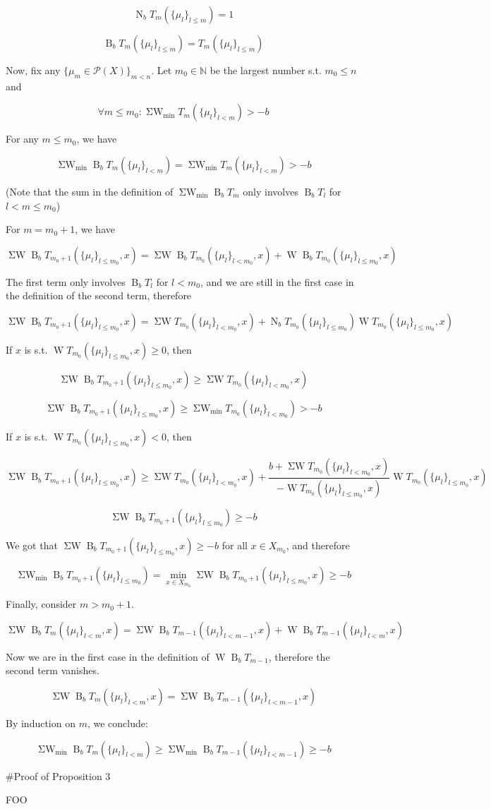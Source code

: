 \documentclass[a4paper]{article}
\newcommand{\Nats}{\mathbb{N}}
\newcommand{\Prob}{\mathcal{P}}
\newcommand{\B}{\operatorname{B}_b}
\newcommand{\N}{\operatorname{N}_b}
\newcommand{\W}{\operatorname{W}}
\newcommand{\SW}{\operatorname{\Sigma W}}
\newcommand{\SWm}{\operatorname{\Sigma W}_{\min}}
\begin{document}
$$\N T_m(\{\mu_l\}_{l \leq m}) = 1$$

$$\B T_m(\{\mu_l\}_{l \leq m}) = T_m(\{\mu_l\}_{l \leq m})$$

Now, fix any ${\{\mu_m \in \Prob(X)\}_{m<n}}$. Let ${m_0 \in \Nats}$ be the largest number s.t. ${m_0 \leq n}$ and 

$$\forall m \leq m_0: \SWm T_m(\{\mu_l\}_{l<m}) > -b$$

For any ${m \leq m_0}$, we have

$$\SWm \B T_m(\{\mu_l \}_{l<m})=\SWm T_m(\{\mu_l \}_{l<m}) > -b$$

(Note that the sum in the definition of ${\SWm \B T_m}$ only involves ${\B T_l}$ for ${l < m \leq m_0}$)

For ${m=m_0+1}$, we have

$$\SW \B T_{m_0+1}(\{\mu_l \}_{l \leq m_0},x) = \SW \B T_{m_0}(\{\mu_l \}_{l < m_0},x) + \W \B T_{m_0}(\{\mu_l \}_{l \leq m_0},x)$$

The first term only involves ${\B T_l}$ for ${l < m_0}$, and we are still in the first case in the definition of the second term, therefore

$$\SW \B T_{m_0+1}(\{\mu_l \}_{l \leq m_0},x) = \SW T_{m_0}(\{\mu_l \}_{l < m_0},x) + \N T_{m_0}(\{\mu_l \}_{l \leq m_0}) \W T_{m_0}(\{\mu_l \}_{l \leq m_0},x)$$

If ${x}$ is s.t. ${\W T_{m_0}(\{\mu_l \}_{l \leq m_0},x) \geq 0}$, then

$$\SW \B T_{m_0+1}(\{\mu_l \}_{l \leq m_0},x) \geq \SW T_{m_0}(\{\mu_l \}_{l < m_0},x)$$

$$\SW \B T_{m_0+1}(\{\mu_l \}_{l \leq m_0},x) \geq \SWm T_{m_0}(\{\mu_l \}_{l < m_0}) > -b$$

If ${x}$ is s.t. ${\W T_{m_0}(\{\mu_l \}_{l \leq m_0},x) < 0}$, then

$$\SW \B T_{m_0+1}(\{\mu_l \}_{l \leq m_0},x) \geq \SW T_{m_0}(\{\mu_l \}_{l < m_0},x) + \frac{b + \SW T_{m_0}(\{\mu_l\}_{l < {m_0}},x)}{-\W T_{m_0}(\{\mu_l\}_{l \leq {m_0}}, x)} \W T_{m_0}(\{\mu_l \}_{l \leq m_0},x)$$

$$\SW \B T_{m_0+1}(\{\mu_l \}_{l \leq m_0}) \geq -b$$

We got that $\SW \B T_{m_0+1}(\{\mu_l \}_{l \leq m_0},x) \geq -b$ for all ${x \in X_{m_0}}$, and therefore

$$\SWm \B T_{m_0+1}(\{\mu_l \}_{l \leq m_0}) = \min_{x \in X_{m_0}} \SW \B T_{m_0+1}(\{\mu_l \}_{l \leq m_0},x) \geq -b$$

Finally, consider ${m > m_0 + 1}$.

$$\SW \B T_{m}(\{\mu_l \}_{l < m},x) = \SW \B T_{m - 1}(\{\mu_l \}_{l < m - 1},x) + \W \B T_{m-1}(\{\mu_l \}_{l < m},x)$$

Now we are in the first case in the definition of ${\W \B T_{m-1}}$, therefore the second term vanishes.

$$\SW \B T_{m}(\{\mu_l \}_{l < m},x) = \SW \B T_{m - 1}(\{\mu_l \}_{l < m - 1},x)$$

By induction on ${m}$, we conclude:

$$\SWm \B T_{m}(\{\mu_l \}_{l < m}) \geq \SWm \B T_{m - 1}(\{\mu_l \}_{l < m - 1}) \geq -b$$

\#Proof of Proposition 3

FOO
\end{document}
